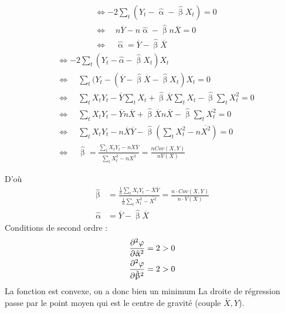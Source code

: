 \documentclass{article}
\begin{document}
\begin{multicols}{2}
\begin{equation*}
\begin{split}
	&\Leftrightarrow -2 \sum_t (Y_t - \hat{\upalpha} - \hat{\upbeta} X_t ) = 0 \\
	&\Leftrightarrow \quad n \overline{Y} - n \hat{\upalpha} - \hat{\upbeta} n \overline{X} = 0 \\
	&\Leftrightarrow \quad \hat{\upalpha} = \overline{Y} - \hat{\upbeta}  \overline{X}
\end{split}
\end{equation*}
\columnbreak
\begin{equation*}
\begin{split}
 	&\Leftrightarrow-2 \sum_t (Y_t - \hat{\alpha} - \hat{\upbeta} X_t) X_t \\
	&\Leftrightarrow \quad \sum_t (Y_t - (\overline{Y} - \hat{\upbeta} \overline{X} - \hat{\upbeta} X_t) X_t = 0 \\
	&\Leftrightarrow \quad \sum_t X_tY_t - \overline{Y} \sum_t X_t + \hat{\upbeta} \overline{X} \sum_t X_t - \hat{\upbeta} \sum_t X_t^2 = 0\\
	&\Leftrightarrow \quad \sum_t X_tY_t - \overline{Y} n \overline{X} + \hat{\upbeta} \overline{X} n \overline{X} - \hat{\upbeta} \sum_t X_t^2 = 0 \\
	&\Leftrightarrow \quad \sum_t X_tY_t - n \overline{X} \overline{Y} - \hat{\upbeta} (\sum_t X_t^2 -n \overline{X^2}) = 0 \\
	&\Leftrightarrow \quad \hat{\upbeta} = \frac{\sum_t X_tY_t - n \overline{X} \overline{Y}}{\sum_t X_t^2 -n \overline{X^2}} = \frac{n Cov(X,Y)}{n V(X)}
\end{split}
\end{equation*}
\end{multicols}
D'où
{\color{red}
\begin{equation*}
\begin{split}
    \hat{\upbeta} &= \frac{\frac{1}{n}\sum_t X_tY_t - \overline{X} \overline{Y}}{\frac{1}{n}\sum_t X_t^2 - \overline{X^2}} = \frac{n \cdot Cov(X,Y)}{n \cdot V(X)} \\
    \hat{\upalpha} &= \overline{Y} - \hat{\upbeta} \overline{X}
\end{split}
\end{equation*}}
Conditions de second ordre : 
\begin{equation*}
\begin{split}
	\pdv[2]{\varphi}{\hat{\upalpha}} &= 2 >0 \\
	\pdv[2]{\varphi}{\hat{\upbeta}} &= 2 >0
\end{split}
\end{equation*}
La fonction est convexe, on a donc bien un minimum 
\newpage
La droite de régression passe par le point moyen qui est le centre de gravité (couple \(\bar{X},Y\)).
\end{document}
